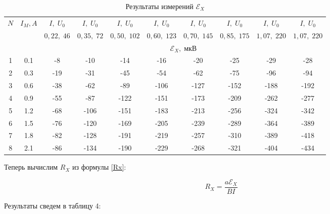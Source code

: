 \documentclass[12pt]{kiarticle} %
\newcommand{\eds}{\ensuremath{ \mathscr{E}}}
\begin{document}
\begin{enumerate}
    \begin{table}[h!]
  	\centering
  	\caption{Результаты измерений $ \eds_X $}
  	\begin{tabularx}{\textwidth}{|c|c|c|c|c|c|c|c|c|c|}
  		\hline
  		\multirow{3}{*}{$ N $} & \multirow{3}{*}{$ I_M, A $} & 
  		$I, \; U_0 $ &
  		$I, \;U_0 $ &
  		$I, \;U_0 $ &
  		$I, \;U_0 $ &
  		$I, \;U_0 $ & 
  		$I, \;U_0 $ &
  		$I, \;U_0 $ &
  		$I, \;U_0 $ 
  		\\
  		& &
  		$0,22,  \;46$ &
  		$ 0,35,  \;72 $ &
  		$  0,50, \;102$ &
  		$  0,60,  \;123$ &
  		$ 0,70,  \;145$ & 
  		$ 0,85, \; 175$ &
  		$  1,07,  \;220 $  &
  		$ 1,07,\; 220 $
  		\\
  		\cline{3-10}
  		& & \multicolumn{8}{|c|}{$ \eds_X, \; мкВ $} \\
  		\hline
  	1 & 0.1 & -8 & -10 & -14 & -16 & -20 & -25 & -29 & -28 \\
  	2 & 0.3 & -19 & -31 & -45 & -54 & -62 & -75 & -96 & -94 \\
  	3 & 0.6 & -38 & -62 & -89 & -106 & -127 & -152 & -188 & -192 \\
  	4 & 0.9 & -55 & -87 & -122 & -151 & -173 & -209 & -262 & -277 \\
  	5 & 1.2 & -68 & -106 & -151 & -183 & -213 & -256 & -324 & -342 \\
  	6 & 1.5 & -76 & -120 & -169 & -205 & -239 & -289 & -364 & -389 \\
  	7 & 1.8 & -82 & -128 & -191 & -219 & -257 & -310 & -389 & -418 \\
  	8 & 2.1 & -86 & -134 & -190 & -229 & -268 & -321 & -404 & -434 \\
  		\hline
  	\end{tabularx}
  	\label{resF}%
  \end{table}%
  
  Теперь вычислим $ R_X $ из формулы \eqref{Rx}:
  
  \begin{equation}\label{}
  R_X = \dfrac{a\eds_X}{BI}
  \end{equation}
  
  Результаты сведем в таблицу 4:
  

\end{enumerate}
\end{document}
